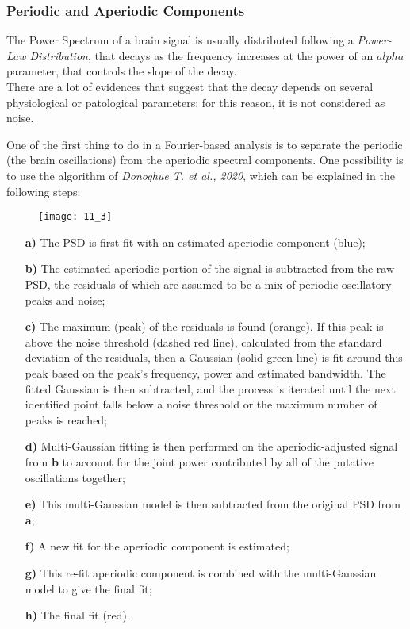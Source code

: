 \subsubsection{Periodic and Aperiodic Components}
The Power Spectrum of a brain signal is usually distributed following a \textit{Power-Law Distribution}, that decays as the frequency increases at the power of an \(alpha\) parameter, 
that controls the slope of the decay.\\
There are a lot of evidences that suggest that the decay depends on several physiological or patological parameters: for this reason, it is not considered as noise.
\par\medskip
One of the first thing to do in a Fourier-based analysis is to separate the periodic (the brain oscillations) from the aperiodic spectral components. One possibility is to use the algorithm 
of \textit{Donoghue T. et al., 2020}, which can be explained in the following steps:
\begin{figure}[H]
    \texttt{[image: 11\_3]}
    \centering
\end{figure}
\begin{itemize}
    \item[\textbf{a)}] The PSD is first fit with an estimated aperiodic component (blue);
    \item[\textbf{b)}] The estimated aperiodic portion of the signal is subtracted from the raw PSD, the residuals of which are assumed to be a mix of periodic oscillatory peaks and noise;
    \item[\textbf{c)}] The maximum (peak) of the residuals is found (orange). If this peak is above the noise threshold (dashed red line), calculated from the standard deviation of the residuals, 
    then a Gaussian (solid green line) is fit around this peak based on the peak's frequency, power and estimated bandwidth. The fitted Gaussian is then subtracted, and the process 
    is iterated until the next identified point falls below a noise threshold or the maximum number of peaks is reached;
    \item[\textbf{d)}] Multi-Gaussian fitting is then performed on the aperiodic-adjusted signal from \textbf{b} to account for the joint power contributed by all of the putative oscillations together;
    \item[\textbf{e)}] This multi-Gaussian model is then subtracted from the original PSD from \textbf{a};
    \item[\textbf{f)}] A new fit for the aperiodic component is estimated;
    \item[\textbf{g)}] This re-fit aperiodic component is combined with the multi-Gaussian model to give the final fit;
    \item[\textbf{h)}] The final fit (red).
\end{itemize}
